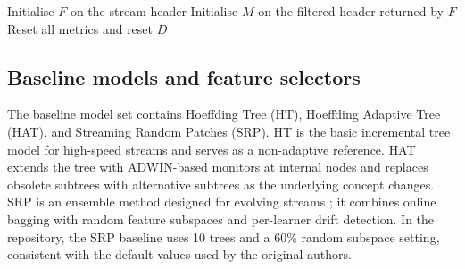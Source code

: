 \documentclass[12pt]{article}
\newcommand{\new}[1]{\textcolor{blue}{#1}}
\begin{document}
\begin{algorithm}[H]
\color{blue}
\caption{\new{Main prequential evaluation and adaptation pipeline}}
Initialise $F$ on the stream header\;
Initialise $M$ on the filtered header returned by $F$\;
Reset all metrics and reset $D$\;
\label{alg:main_pipeline}
\end{algorithm}

\subsection{Baseline models and feature selectors}
\label{subsec:baseline}

The baseline model set contains Hoeffding Tree (HT), Hoeffding Adaptive Tree
(HAT), and Streaming Random Patches (SRP). HT is the basic incremental tree
model for high-speed streams \cite{hulten2001mining} and serves as a
non-adaptive reference. HAT extends the tree with ADWIN-based monitors at
internal nodes and replaces obsolete subtrees with alternative subtrees as the
underlying concept changes. SRP is an ensemble method designed for evolving
streams \cite{gomes2019streaming}; it combines online bagging with random
feature subspaces and per-learner drift detection. In the repository, the SRP
baseline uses 10 trees and a 60\% random subspace setting, consistent with the
default values used by the original authors.
\end{document}
